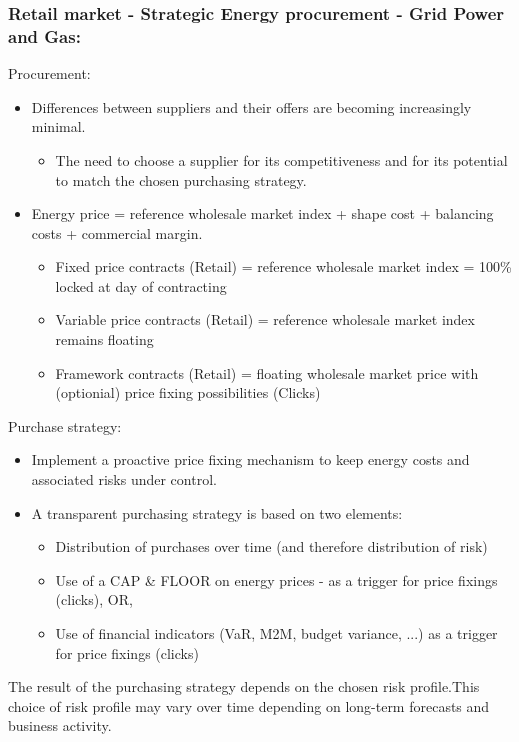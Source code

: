 \documentclass[12pt]{article}
\begin{document}
\subsubsection{Retail market - Strategic Energy procurement - Grid Power and Gas:}
Procurement:\begin{itemize}
    \item Differences between suppliers and their offers are becoming increasingly minimal.\begin{itemize}
        \item The need to choose a supplier for its competitiveness and for its potential to match the chosen purchasing strategy.
    \end{itemize}
    \item Energy price = reference wholesale market index + shape cost + balancing costs + commercial margin.\begin{itemize}
        \item Fixed price contracts (Retail) = reference wholesale market index = 100\% locked at day of contracting
        \item Variable price contracts (Retail) = reference wholesale market index remains floating
        \item Framework contracts (Retail) = floating wholesale market price with (optionial) price fixing possibilities (Clicks)
    \end{itemize}
\end{itemize}
Purchase strategy:\begin{itemize}
    \item Implement a proactive price fixing mechanism to keep energy costs and associated risks under control. 
    \item A transparent purchasing strategy is based on two elements:\begin{itemize}
        \item Distribution of purchases over time (and therefore distribution of risk) 
        \item Use of a CAP \& FLOOR on energy prices - as a trigger for price fixings (clicks), OR, 
        \item Use of financial indicators (VaR, M2M, budget variance, ...) as a trigger for price fixings (clicks)
    \end{itemize}
\end{itemize}
The result of the purchasing strategy depends on the chosen risk profile.This choice of risk profile may vary over time depending on long-term forecasts and business activity.
\end{document}
